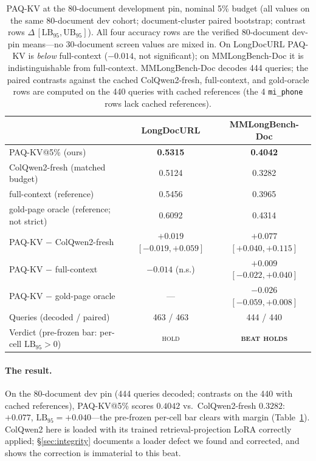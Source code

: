 \documentclass[letterpaper]{article} %
\newcommand{\paqc}{\textsc{PAQ-KV}}
\newcommand{\lb}{\mathrm{LB}_{95}}
\begin{document}
\begin{table}[t]
\centering\small
\begin{tabular}{lcc}
\toprule
 & LongDocURL & MMLongBench-Doc \\
\midrule
\paqc{}@5\% (ours) & \textbf{0.5315} & \textbf{0.4042} \\
ColQwen2-fresh (matched budget) & 0.5124 & 0.3282 \\
full-context (reference) & 0.5456 & 0.3965 \\
gold-page oracle (reference; not strict) & 0.6092 & 0.4314 \\
\midrule
\paqc{} $-$ ColQwen2-fresh & $+0.019$ $[-0.019,+0.059]$ & $+0.077$ $[+0.040,+0.115]$ \\
\paqc{} $-$ full-context & $-0.014$ (n.s.) & $+0.009$ $[-0.022,+0.040]$ \\
\paqc{} $-$ gold-page oracle & --- & $-0.026$ $[-0.059,+0.008]$ \\
\midrule
Queries (decoded / paired) & 463 / 463 & 444 / 440 \\
Verdict (pre-frozen bar: per-cell $\lb>0$) & \textsc{hold} & \textbf{\textsc{beat holds}} \\
\bottomrule
\end{tabular}
\caption{\paqc{} at the 80-document development pin, nominal 5\% budget (all values on the same 80-document dev cohort; document-cluster paired bootstrap; contrast rows $\Delta\,[\lb,\mathrm{UB}_{95}]$). All four accuracy rows are the verified 80-document dev-pin means---no 30-document screen values are mixed in. On LongDocURL \paqc{} is \emph{below} full-context ($-0.014$, not significant); on MMLongBench-Doc it is indistinguishable from full-context. MMLongBench-Doc decodes 444 queries; the paired contrasts against the cached ColQwen2-fresh, full-context, and gold-oracle rows are computed on the 440 queries with cached references (the 4 \texttt{mi\_phone} rows lack cached references).}
\label{tab:paqkv}
\end{table}

\paragraph{The result.} On the 80-document dev pin (444 queries decoded; contrasts on the 440 with cached references), \paqc{}@5\% scores $0.4042$ vs.\ ColQwen2-fresh $0.3282$: $+0.077$, $\lb=+0.040$---the pre-frozen per-cell bar clears with margin (Table~\ref{tab:paqkv}). ColQwen2 here is loaded with its trained retrieval-projection LoRA correctly applied; \S\ref{sec:integrity} documents a loader defect we found and corrected, and shows the correction is immaterial to this beat.
\end{document}
